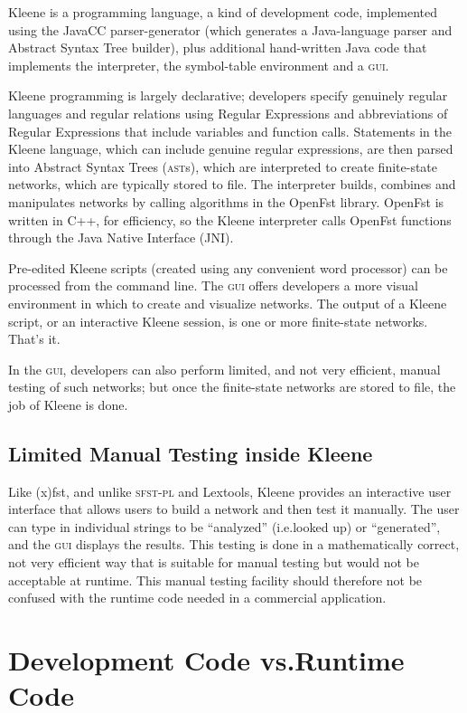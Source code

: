 \documentclass[letterpaper,12pt]{article}
\providecommand{\acro}{}\renewcommand{\acro}{\textsc}
\begin{document}
Kleene is a programming language, a kind of development code, implemented using the JavaCC parser-generator (which generates a
Java-language parser and Abstract Syntax Tree builder), plus additional hand-written Java code that implements the
interpreter, the symbol-table environment and a \acro{gui}. 

Kleene programming is largely declarative; developers specify genuinely regular languages and regular relations using
Regular Expressions and abbreviations of Regular Expressions that include variables and function
calls.  Statements in the Kleene language, which can include genuine regular expressions,
are then parsed into Abstract Syntax Trees (\acro{ast}s), which are
interpreted to create finite-state networks, which are typically stored to file.  The interpreter builds, combines and manipulates networks
by calling algorithms in the OpenFst library.   OpenFst is written in C++, for efficiency, so the Kleene interpreter calls OpenFst functions
through the Java Native Interface (JNI).

Pre-edited Kleene scripts (created using any convenient word processor) can be processed from the command line.  The \acro{gui} offers
developers a more visual environment in which to create and visualize networks.  The output of a Kleene script, or an interactive Kleene
session, is one or more finite-state networks.  That's it.  

In the
\acro{gui}, developers can also perform limited, and not very efficient, manual testing of such networks; but once the finite-state networks
are stored to file, the job of Kleene is done.

\subsection{Limited Manual Testing inside Kleene}

Like (x)fst, and unlike \acro{sfst-pl} and Lextools, Kleene provides an interactive user interface that allows users to
build a network and then test it manually.  The user can type in individual strings to be
``analyzed'' (i.e.\@ looked up) or ``generated'', and the \acro{gui} displays the results.  This testing is done in a mathematically correct, not very efficient way that
is suitable for manual testing but would not be acceptable at runtime.  This manual testing facility should therefore not
be confused with the runtime code needed in a commercial application.

\section{Development Code vs.\@ Runtime Code}
\end{document}
